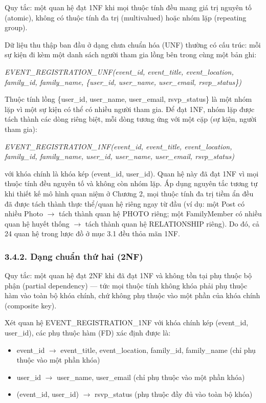 Quy tắc: một quan hệ đạt 1NF khi mọi thuộc tính đều mang giá trị nguyên tố (atomic), không có thuộc tính đa trị (multivalued) hoặc nhóm lặp (repeating group).

Dữ liệu thu thập ban đầu ở dạng chưa chuẩn hóa (UNF) thường có cấu trúc: mỗi sự kiện đi kèm một danh sách người tham gia lồng bên trong cùng một bản ghi:

\textit{EVENT\_REGISTRATION\_UNF(event\_id, event\_title, event\_location, family\_id, family\_name, \{user\_id, user\_name, user\_email, rsvp\_status\})}

Thuộc tính lồng \{user\_id, user\_name, user\_email, rsvp\_status\} là một nhóm lặp vì một sự kiện có thể có nhiều người tham gia. Để đạt 1NF, nhóm lặp được tách thành các dòng riêng biệt, mỗi dòng tương ứng với một cặp (sự kiện, người tham gia):

\textit{EVENT\_REGISTRATION\_1NF(event\_id, event\_title, event\_location, family\_id, family\_name, user\_id, user\_name, user\_email, rsvp\_status)}

với khóa chính là khóa kép (event\_id, user\_id). Quan hệ này đã đạt 1NF vì mọi thuộc tính đều nguyên tố và không còn nhóm lặp. Áp dụng nguyên tắc tương tự khi thiết kế mô hình quan niệm ở Chương 2, mọi thuộc tính đa trị tiềm ẩn đều đã được tách thành thực thể/quan hệ riêng ngay từ đầu (ví dụ: một Post có nhiều Photo $\rightarrow$ tách thành quan hệ PHOTO riêng; một FamilyMember có nhiều quan hệ huyết thống $\rightarrow$ tách thành quan hệ RELATIONSHIP riêng). Do đó, cả 24 quan hệ trong lược đồ ở mục 3.1 đều thỏa mãn 1NF.

\subsubsection{3.4.2. Dạng chuẩn thứ hai (2NF)}

Quy tắc: một quan hệ đạt 2NF khi đã đạt 1NF và không tồn tại phụ thuộc bộ phận (partial dependency) --- tức mọi thuộc tính không khóa phải phụ thuộc hàm vào toàn bộ khóa chính, chứ không phụ thuộc vào một phần của khóa chính (composite key).

Xét quan hệ EVENT\_REGISTRATION\_1NF với khóa chính kép (event\_id, user\_id), các phụ thuộc hàm (FD) xác định được là:

\begin{itemize}
	\item event\_id $\rightarrow$ event\_title, event\_location, family\_id, family\_name (chỉ phụ thuộc vào một phần khóa)
	\item user\_id $\rightarrow$ user\_name, user\_email (chỉ phụ thuộc vào một phần khóa)
	\item (event\_id, user\_id) $\rightarrow$ rsvp\_status (phụ thuộc đầy đủ vào toàn bộ khóa)
\end{itemize}

